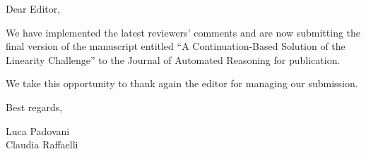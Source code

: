 \documentclass[12pt]{letter}
\begin{document}
\begin{letter}{}
\opening{Dear Editor,}

We have implemented the latest reviewers' comments and are now submitting the
final version of the manuscript entitled ``A Continuation-Based Solution of the
Linearity Challenge'' to the Journal of Automated Reasoning for publication.

We take this opportunity to thank again the editor for managing our submission.

\closing{Best regards,}

Luca Padovani \\Claudia Raffaelli

\end{letter}
\end{document}
